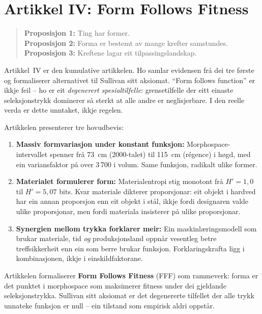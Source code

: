 \documentclass[12pt,a4paper,oneside]{report}
\begin{document}
\section{Artikkel IV: Form Follows Fitness}
\label{sec:art4}

\begin{quote}
\textbf{Proposisjon 1:} Ting har former.\\
\textbf{Proposisjon 2:} Forma er bestemt av mange krefter samstundes.\\
\textbf{Proposisjon 3:} Kreftene lagar eit tilpassingslandskap.
\end{quote}

Artikkel~IV er den kumulative artikkelen. Ho samlar evidensen frå dei tre første og formaliserer alternativet til Sullivan sitt aksiomat. ``Form follows function'' er ikkje feil -- ho er eit \emph{degenerert spesialtilfelle}: grensetilfelle der eitt einaste seleksjonstrykk dominerer så sterkt at alle andre er neglisjerbare. I den reelle verda er dette unntaket, ikkje regelen.

Artikkelen presenterer tre hovudbevis:

\begin{enumerate}
  \item \textbf{Massiv formvariasjon under konstant funksjon:} Morphospace-intervallet spenner frå 73~cm (2000-talet) til 115~cm (régence) i høgd, med ein variansfaktor på over 3\,700 i volum. Same funksjon, radikalt ulike former.

  \item \textbf{Materialet formulerer form:} Materialentropi stig monotont frå $H' = 1{,}0$ til $H' = 5{,}07$ bits. Kvar materiale dikterer proporsjonar: eit objekt i hardved har ein annan proporsjon enn eit objekt i stål, ikkje fordi designaren valde ulike proporsjonar, men fordi materiala insisterer på ulike proporsjonar.

  \item \textbf{Synergien mellom trykka forklarer meir:} Ein maskinlæringsmodell som brukar materiale, tid \emph{og} produksjonsland oppnår vesentleg betre treffsikkerheit enn ein som berre brukar funksjon. Forklaringskrafta ligg i kombinasjonen, ikkje i einskildfaktorane.
\end{enumerate}

Artikkelen formaliserer \textbf{Form Follows Fitness} (FFF) som rammeverk: forma er det punktet i morphospace som maksimerer fitness under dei gjeldande seleksjonstrykka. Sullivan sitt aksiomat er det degenererte tilfellet der alle trykk unnateke funksjon er null -- ein tilstand som empirisk aldri oppstår.
\end{document}
